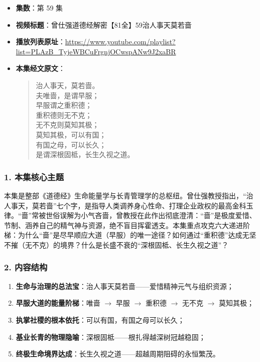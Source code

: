 \begin{itemize}
    \item \textbf{集数}：第 59 集
    \item \textbf{视频标题}：曾仕强道德经解密【81全】59治人事天莫若啬
    \item \textbf{播放列表原址}：\url{https://www.youtube.com/playlist?list=PLAzB_TyjeWBCuFrgnjOCwspANw9J2xaBR}
    \item \textbf{本集经文原文}：
    \begin{quote}\kaishu
    治人事天，莫若啬。\\
    夫唯啬，是谓早服；\\
    早服谓之重积德；\\
    重积德则无不克；\\
    无不克则莫知其极；\\
    莫知其极，可以有国；\\
    有国之母，可以长久；\\
    是谓深根固柢，长生久视之道。
    \end{quote}
\end{itemize}

\subsubsection{1. 本集核心主题}
本集是整部《道德经》生命能量学与长青管理学的总枢纽。曾仕强教授指出，“治人事天，莫若啬”七个字，是指导人类调养身心性命、打理企业政权的最高金科玉律。“啬”常被世俗误解为小气吝啬，曾教授在此作出彻底澄清：“啬”是极度爱惜、节制、涵养自己的精气神与资源，绝不盲目挥霍透支。本集重点攻克六大递进阶梯：为什么“啬”是尽早顺应大道（早服）的唯一途径？如何通过“重积德”达成无坚不摧（无不克）的境界？什么是长盛不衰的“深根固柢、长生久视之道”？

\subsubsection{2. 内容结构}
\begin{enumerate}
    \item \textbf{生命与治理的总法宝}：治人事天莫若啬——爱惜精神元气与组织资源；
    \item \textbf{早服大道的能量阶梯}：唯啬 $\rightarrow$ 早服 $\rightarrow$ 重积德 $\rightarrow$ 无不克 $\rightarrow$ 莫知其极；
    \item \textbf{执掌社稷的根本依托}：可以有国，有国之母可以长久；
    \item \textbf{基业长青的物理隐喻}：深根固柢——根扎得越深树冠越稳固；
    \item \textbf{终极生命境界达成}：长生久视之道——超越周期阻碍的永恒繁茂。
\end{enumerate}

